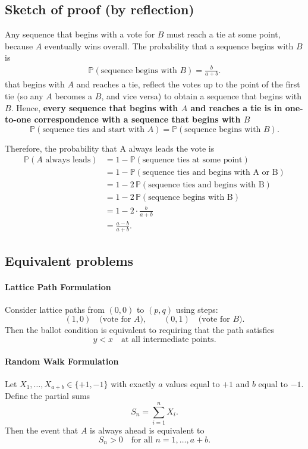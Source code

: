 \documentclass[11pt,A4,twoside]{article}
\let\oldsubsection\subsection
\renewcommand{\subsection}{\FloatBarrier\oldsubsection}
\numberwithin{equation}{section}
\theoremstyle{definition}
\theoremstyle{remark}
\newcommand\bal{\begin{aligned}}
\newcommand\eal{\end{aligned}}
\newcommand{\beql}[1]{\begin{equation}\label{#1}\bal}
\newcommand{\eeql}{\eal\end{equation}}
\newcommand{\Prob}{\mathbb{P}}
\begin{document}
\subsection{Sketch of proof (by reflection)} 
Any sequence that begins with a vote for $B$ must reach a tie at some point, because $A$ eventually wins overall. 
The probability that a sequence begins with $B$ is
\beql{eq:ballot-prob}
\Prob(\text{sequence begins with $B$}) = \frac{b}{a+b}.
\eeql that begins with $A$ and reaches a tie, reflect the votes up to the point of the first tie (so any $A$ becomes a $B$, and vice versa) to obtain a sequence that begins with $B$. Hence, \textbf{every sequence that begins with $A$ and reaches a tie is in one-to-one correspondence with a sequence that begins with $B$}
\[
\Prob(\text{sequence ties and start with $A$}) = \Prob(\text{sequence begins with $B$}).
\]

Therefore, the probability that A always leads the vote is
\[
\begin{aligned}
\mathbb{P}(\text{$A$ always leads})
&= 1 - \mathbb{P}(\text{sequence ties at some point}) \\
&= 1 - \mathbb{P}(\text{sequence ties and begins with A or B}) \\
&= 1 - 2 \, \mathbb{P}(\text{sequence ties and begins with B}) \\
&= 1 - 2 \, \mathbb{P}(\text{sequence begins with B}) \\
&= 1 - 2 \cdot \frac{b}{a+b} \\
&= \frac{a-b}{a+b}.
\end{aligned}
\]
\subsection{Equivalent problems}
\paragraph{Lattice Path Formulation}
Consider lattice paths from $(0,0)$ to $(p,q)$ using steps:
\[
(1,0) \quad \text{(vote for $A$)}, 
\qquad (0,1) \quad \text{(vote for $B$)}.
\]
Then the ballot condition is equivalent to requiring that the path satisfies
\[
y < x \quad \text{at all intermediate points.}
\]

\paragraph{Random Walk Formulation}
Let $X_1,\dots,X_{a+b} \in \{+1,-1\}$ with exactly $a$ values equal to $+1$ and $b$ equal to $-1$.  
Define the partial sums
\[
S_n = \sum_{i=1}^n X_i.
\]
Then the event that $A$ is always ahead is equivalent to
\[
S_n > 0 \quad \text{for all } n = 1,\dots,a+b.
\]
\end{document}
